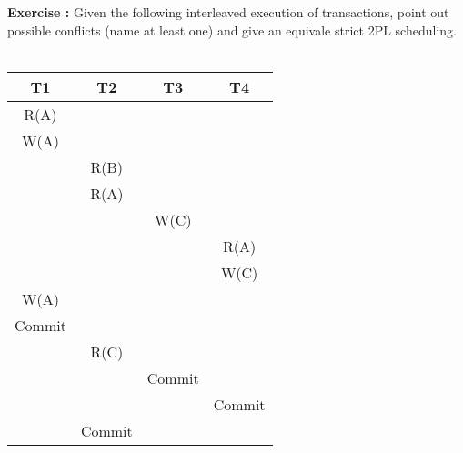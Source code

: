 \documentclass[10pt,a4paper]{article}
\newcommand{\exerciseDesc}{Given the following interleaved execution of transactions, point out possible conflicts (name at least one) and give an equivale strict 2PL scheduling.}
\newcounter{exerciseCount}
\newcommand{\exercise}[1]
{
	\noindent
	\textbf{Exercise \theexerciseCount:} \exerciseDesc \\\\#1
	\setcounter{exerciseCount}{\theexerciseCount + 1}
}
\begin{document}
	\exercise{\begin{table}[!h]
			\centering
			\begin{tabular}{c|c|c|c}
				T1 & T2 & T3 & T4 \\
				\hline
				R(A) & & & \\
				W(A) & & & \\
				& R(B) & & \\
				& R(A) & & \\
				& & W(C) & \\
				& & & R(A) \\
				& & & W(C) \\
				W(A) & & & \\
				Commit & & & \\
				& R(C) & & \\
				& & Commit & \\
				& & & Commit \\
				& Commit & & 
			\end{tabular}
	\end{table}}
	
	
\end{document}
